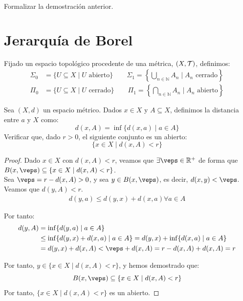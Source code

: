 \begin{ejercicio}
    Formalizar la demostración anterior.
\end{ejercicio}

\section{Jerarquía de Borel}
Fijado un espacio topológico procedente de una métrica, $(X,\mathcal{T})$, definimos:
\begin{align*}
    \Sigma_0 &= \{U\subseteq X \mid U \text{\ abierto}\} \qquad \Sigma_1 = \left\{\bigcup_{n\in \mathbb{N}} A_n \mid A_ n\text{\ cerrado}\right\} \\
    \Pi_0 &= \{U\subseteq X \mid U \text{\ cerrado}\} \qquad \Pi_1 = \left\{\bigcap_{n\in \mathbb{N}} A_n \mid A_n \text{\ abierto}\right\}
\end{align*}

\begin{ejercicio}
    Sea $(X,d)$ un espacio métrico. Dados $x\in X$ y $A\subseteq X$, definimos la distancia entre $a$ y $X$ como:
    \begin{equation*}
        d(x,A) = \inf\{d(x,a) \mid a\in A\}
    \end{equation*}
    Verificar que, dado $r>0$, el siguiente conjunto es un abierto:
    \begin{equation*}
        \{x\in X\mid d(x,A) < r\}
    \end{equation*}
\end{ejercicio}
\begin{proof}
    Dado $x\in X$ con $d(x,A) < r$, veamos que $\exists \veps\in \mathbb{R}^+$ de forma que $B(x,\veps) \subseteq \{x\in X\mid d(x,A) < r\}$.\\

    Sea $\veps=r-d(x,A)>0$, y sea $y\in B(x,\veps)$, es decir, $d(x,y) < \veps$. Veamos que $d(y,A) < r$.
    \begin{align*}
        d(y,a) \leq d(y,x) + d(x,a) \forall a\in A
    \end{align*}

    Por tanto:
    \begin{align*}
        d(y,A) &= \inf\{d(y,a) \mid a\in A\} \\
        &\leq \inf\{d(y,x) + d(x,a) \mid a\in A\}
        = d(y,x) + \inf\{d(x,a) \mid a\in A\} \\
        &= d(y,x) + d(x,A)< \veps + d(x,A) = r-d(x,A) + d(x,A) = r
    \end{align*}

    Por tanto, $y\in \{x\in X\mid d(x,A) < r\}$, y hemos demostrado que:
    \begin{equation*}
        B(x,\veps) \subseteq \{x\in X\mid d(x,A) < r\}
    \end{equation*}
    Por tanto, $\{x\in X\mid d(x,A) < r\}$ es un abierto.
\end{proof}


